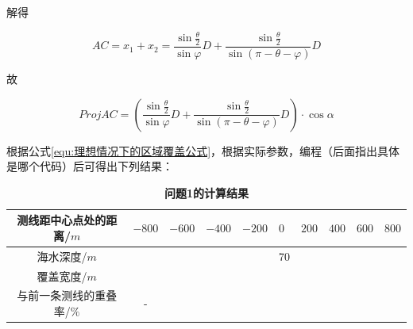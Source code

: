 解得

\begin{equation}
    AC = x_1 + x_2 
       = \frac{\sin\frac{\theta}{2}}{\sin\varphi}D + \frac{\sin\frac{\theta}{2}}{\sin(\pi - \theta - \varphi)}D
\end{equation}

故

\begin{equation}
    Proj AC = \left(\frac{\sin\frac{\theta}{2}}{\sin\varphi}D + \frac{\sin\frac{\theta}{2}}{\sin(\pi - \theta - \varphi)}D\right) \cdot \cos \alpha
    \label{equ:理想情况下的区域覆盖公式}
\end{equation}

根据公式\ref{equ:理想情况下的区域覆盖公式}，根据实际参数，编程（后面指出具体是哪个代码）后可得出下列结果：

\begin{table}[h]
    \centering
    \caption{\textbf{问题1的计算结果}}
    \begin{tabular}{@{}ccllllllll@{}}
    \toprule
    测线距中心点处的距离/$m$  & $-800$ & $-600$ & $-400$ & $-200$ & $0$ & $200$ & $400$ & $600$ & $800$ \\ \midrule
    海水深度/$m$        &      &      &      &      & 70  &     &     &     &     \\
    覆盖宽度/$m$        &      &      &      &      &   &     &     &     &     \\
    与前一条测线的重叠率/$\%$ &   -  &      &      &      &   &     &     &     &     \\ \bottomrule
    \end{tabular}
\end{table}



